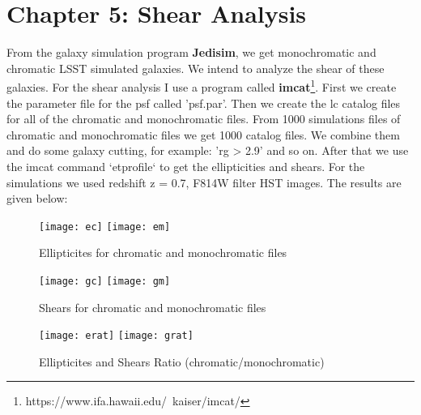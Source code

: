 %
%
%
%
\section{Chapter 5: Shear Analysis}\label{sec:chap5}
From the galaxy simulation program \textbf{Jedisim}, we get monochromatic and chromatic LSST simulated galaxies. We intend to
analyze the shear of these galaxies. For the shear analysis I use a program called \textbf{imcat}\footnote{https://www.ifa.hawaii.edu/~kaiser/imcat/}. First we create the parameter file for the psf called 'psf.par'. Then we create the lc catalog files for all of the chromatic and monochromatic files. From 1000 simulations files of chromatic and monochromatic files we get 1000 catalog files. We combine them and do some galaxy cutting, for example: 'rg > 2.9' and so on. After that we use the imcat command `etprofile` to get the ellipticities and shears. For the simulations we used redshift z = 0.7, F814W filter HST images. The results are given below:
\begin{figure}[ht!]
    \centering
    \texttt{[image: ec]}
    \texttt{[image: em]}
    \caption{Ellipticites for chromatic and monochromatic files}
\end{figure}

\newpage
\begin{figure}[ht!]
    \centering
    \texttt{[image: gc]}
    \texttt{[image: gm]}
    \caption{Shears for chromatic and monochromatic files}
\end{figure}

\begin{figure}[ht!]
    \centering
    \texttt{[image: erat]}
    \texttt{[image: grat]}
    \caption{Ellipticites and Shears Ratio (chromatic/monochromatic) }
\end{figure}
